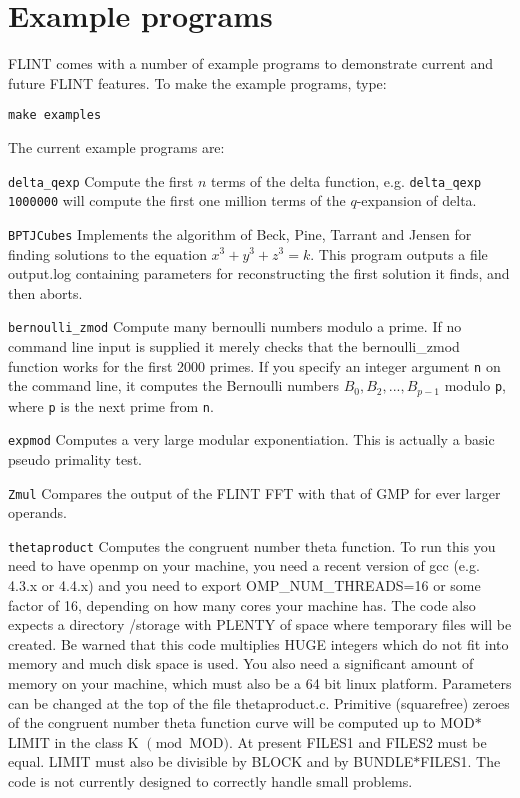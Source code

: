 \documentclass[a4paper,10pt]{article}
\newcommand{\code}{\lstinline}
\begin{document}
\section{Example programs}

FLINT comes with a number of example programs to demonstrate current and future FLINT features. To make the example programs, type:

\code{make examples}

The current example programs are:

\code{delta_qexp} Compute the first $n$ terms of the delta function, e.g. \code{delta_qexp 1000000} will compute the first one million terms of the $q$-expansion of delta.

\code{BPTJCubes} Implements the algorithm of Beck, Pine, Tarrant and Jensen for finding solutions to the equation $x^3+y^3+z^3 = k$. This program outputs a file output.log containing parameters for reconstructing the first solution it finds, and then aborts.

\code{bernoulli_zmod} Compute many bernoulli numbers modulo a prime. If no command line input is supplied it merely checks that the bernoulli\_zmod function works for the first 2000 primes. If you specify an integer argument \code{n} on the command line, it computes the Bernoulli numbers $B_0, B_2, ..., B_{p-1}$ modulo \code{p}, where \code{p} is the next prime from \code{n}.

\code{expmod} Computes a very large modular exponentiation. This is actually a basic pseudo primality test.

\code{Zmul} Compares the output of the FLINT FFT with that of GMP for ever larger operands.

\code{thetaproduct} Computes the congruent number theta function. To run this you need to have openmp on your machine, you need a recent version of gcc (e.g. 4.3.x or 4.4.x) and you need to export OMP\_NUM\_THREADS=16 or some factor of 16, depending on how many cores your machine has. The code also expects a directory /storage with PLENTY of space where temporary files will be created. Be warned that this code multiplies HUGE integers which do not fit into memory and much disk space is used. You also need a significant amount of memory on your machine, which must also be a 64 bit linux platform. Parameters can be changed at the top of the file thetaproduct.c. Primitive (squarefree) zeroes of the congruent number theta function curve will be computed up to MOD$*$LIMIT in the class K $\pmod{\mbox{MOD}}$. At present FILES1 and FILES2 must be equal. LIMIT must also be divisible by BLOCK and by BUNDLE$*$FILES1. The code is not currently designed to correctly handle small problems.  
\end{document}
